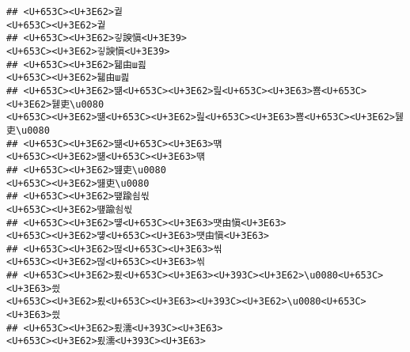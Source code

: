 \documentclass[]{article}
\begin{document}
\begin{verbatim}
## <U+653C><U+3E62>궡                                                                                                                                                                                                     <U+653C><U+3E62>궡
## <U+653C><U+3E62>깋諛愼<U+3E39>                                                                                                                                                                                   <U+653C><U+3E62>깋諛愼<U+3E39>
## <U+653C><U+3E62>뒓由ш쾶                                                                                                                                                                                         <U+653C><U+3E62>뒓由ш쾶
## <U+653C><U+3E62>떎<U+653C><U+3E62>릺<U+653C><U+3E63>뿀<U+653C><U+3E62>뒗吏\u0080                                                                                                             <U+653C><U+3E62>떎<U+653C><U+3E62>릺<U+653C><U+3E63>뿀<U+653C><U+3E62>뒗吏\u0080
## <U+653C><U+3E62>떎<U+653C><U+3E63>떆                                                                                                                                                                             <U+653C><U+3E62>떎<U+653C><U+3E63>떆
## <U+653C><U+3E62>떒吏\u0080                                                                                                                                                                                     <U+653C><U+3E62>떒吏\u0080
## <U+653C><U+3E62>떞踰쇰씫                                                                                                                                                                                         <U+653C><U+3E62>떞踰쇰씫
## <U+653C><U+3E62>떟<U+653C><U+3E63>떗由愼<U+3E63>                                                                                                                                                           <U+653C><U+3E62>떟<U+653C><U+3E63>떗由愼<U+3E63>
## <U+653C><U+3E62>떦<U+653C><U+3E63>씪                                                                                                                                                                             <U+653C><U+3E62>떦<U+653C><U+3E63>씪
## <U+653C><U+3E62>룄<U+653C><U+3E63><U+393C><U+3E62>\u0080<U+653C><U+3E63>씠                                                                                                                         <U+653C><U+3E62>룄<U+653C><U+3E63><U+393C><U+3E62>\u0080<U+653C><U+3E63>씠
## <U+653C><U+3E62>룄濡<U+393C><U+3E63>                                                                                                                                                                             <U+653C><U+3E62>룄濡<U+393C><U+3E63>

\end{verbatim}
\end{document}
